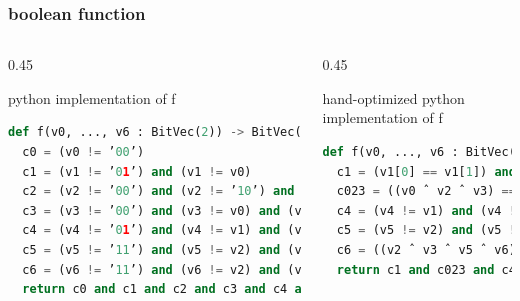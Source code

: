 \documentclass[aspectratio=1610]{beamer}
\begin{document}
\begin{frame}[fragile]
  \frametitle{boolean function}
  \begin{columns}
    \begin{column}{0.45\linewidth}
      \begin{block}{python implementation of f }
        \begin{lstlisting}[language=Python]
def f(v0, ..., v6 : BitVec(2)) -> BitVec(1):
  c0 = (v0 != ’00’)
  c1 = (v1 != ’01’) and (v1 != v0)
  c2 = (v2 != ’00’) and (v2 != ’10’) and (v2 != v0)
  c3 = (v3 != ’00’) and (v3 != v0) and (v3 != v1) and (v3 != v2)
  c4 = (v4 != ’01’) and (v4 != v1) and (v4 != v3)
  c5 = (v5 != ’11’) and (v5 != v2) and (v5 != v3)
  c6 = (v6 != ’11’) and (v6 != v2) and (v6 != v3) and (v6 != v4) and (v6 != v5)
  return c0 and c1 and c2 and c3 and c4 and c5 and c6
          \end{lstlisting}
      \end{block}
    \end{column}
    \begin{column}{0.45\linewidth}
      \begin{block}{hand-optimized python implementation of f }
        \begin{lstlisting}[language=Python]
def f(v0, ..., v6 : BitVec(2)) -> BitVec(1):
  c1 = (v1[0] == v1[1]) and (v3 != v1)
  c023 = ((v0 ˆ v2 ˆ v3) == ’00’)
  c4 = (v4 != v1) and (v4 != v3)
  c5 = (v5 != v2) and (v5 != v3)
  c6 = ((v2 ˆ v3 ˆ v5 ˆ v6) == ’00’) and (v6 != v4)
  return c1 and c023 and c4 and c5 and c6
          \end{lstlisting}
      \end{block}
    \end{column}
  \end{columns}
\end{frame}
\end{document}
